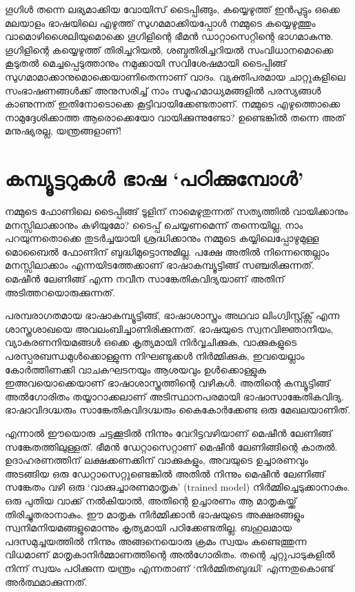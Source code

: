 \documentclass[12pt,twoside,a4paper]{article}
\begin{document}
ഗൂഗിൾ തന്നെ ലഭ്യമാക്കിയ വോയിസ് ടൈപ്പിങ്ങും, കയ്യെഴുത്ത് ഇൻപുട്ടും ഒക്കെ മലയാളം ഭാഷയിലെ എഴുത്ത് സുഗമമാക്കിയപ്പോൾ നമ്മുടെ കയ്യെഴുത്തും വാമൊഴിശൈലിയുമൊക്കെ ഗൂഗിളിന്റെ ഭീമൻ ഡാറ്റാസെറ്റിന്റെ ഭാഗമാകുന്നു. ഗൂഗിളിന്റെ കയ്യെഴുത്ത് തിരിച്ചറിയൽ, ശബ്ദതിരിച്ചറിയൽ സംവിധാനമൊക്കെ കൂടുതൽ മെച്ചപ്പെടുത്താനും നമുക്കായി സവിശേഷമായി ടൈപ്പിങ്ങ് സുഗമാമാക്കാനുമൊക്കെയാണിതെന്നാണ് വാദം. വ്യക്തിപരമായ ചാറ്റുകളിലെ സംഭാഷണങ്ങൾക്ക് അനുസരിച്ച് നാം സമൂഹമാധ്യമങ്ങളിൽ പരസ്യങ്ങൾ  കാണുന്നത് ഇതിനോടൊക്കെ കൂട്ടിവായിക്കേണ്ടതാണ്. നമ്മുടെ എഴുത്തൊക്കെ നാമുദ്ദേശിക്കാത്ത ആരൊക്കെയോ വായിക്കുന്നുണ്ടോ? ഉണ്ടെങ്കിൽ തന്നെ അത് മനുഷ്യരല്ല, യന്ത്രങ്ങളാണ്!

\section{കമ്പ്യൂട്ടറുകൾ ഭാഷ `പഠിക്കുമ്പോൾ'}

നമ്മുടെ ഫോണിലെ ടൈപ്പിങ്ങ് ടൂളിന് നാമെഴുതുന്നത്  സത്യത്തിൽ വായിക്കാനും മനസ്സിലാക്കാനും കഴിയുമോ?  ടൈപ്പ് ചെയ്യണമെന്ന് തന്നെയില്ല, നാം പറയുന്നതൊക്കെ തുടർച്ചയായി ശ്രദ്ധിക്കാനും നമ്മുടെ കയ്യിലെപ്പോഴുമുള്ള മൊബൈൽ ഫോണിന് ബുദ്ധിമുട്ടൊന്നുമില്ല. പക്ഷേ അതിൽ നിന്നെന്തെല്ലാം മനസ്സിലാക്കാം എന്നയിടത്തേക്കാണ് ഭാഷാകമ്പ്യൂട്ടിങ്ങ് സഞ്ചരിക്കുന്നത്. മെഷീൻ ലേണിങ്ങ് എന്ന നവീന സാങ്കേതികവിദ്യയാണ് അതിന് അടിത്തറയൊരുക്കുന്നത്.

പരമ്പരാഗതമായ ഭാഷാകമ്പ്യൂട്ടിങ്ങ്, ഭാഷാശാസ്ത്രം അഥവാ ലിംഗ്വിസ്റ്റ്ക്സ് എന്ന ശാസ്ത്രശാഖയെ അവലംബിച്ചാണിരിക്കുന്നത്. ഭാഷയുടെ സ്വനവിജ്ഞാനീയം, വ്യാകരണനിയമങ്ങൾ ഒക്കെ കൃത്യമായി നിർവ്വചിക്കുക, വാക്കുകളുടെ പരസ്പരബന്ധമുൾക്കൊള്ളുന്ന നിഘണ്ടുക്കൾ നിർമ്മിക്കുക, ഇവയെല്ലാം കോർത്തിണക്കി വാചകഘടനയും ആശയവും ഉൾക്കൊള്ളുക ഇഅവയൊക്കെയാണ് ഭാഷാശാസ്ത്രത്തിന്റെ വഴികൾ. അതിന്റെ കമ്പ്യൂട്ടിങ്ങ് അൽഗോരിതം തയ്യാറാക്കലാണ് അടിസ്ഥാനപരമായി ഭാഷാസാങ്കേതികവിദ്യ. ഭാഷാവിദഗ്ദ്ധരും സാങ്കേതികവിദഗ്ദ്ധരും കൈകോർക്കേണ്ട ഒരു മേഖലയാണിത്.

എന്നാൽ ഈയൊരു ചട്ടക്കൂടിൽ നിന്നും വേറിട്ടവഴിയാണ് മെഷീൻ ലേണിങ്ങ് സങ്കേതത്തിലുള്ളത്. ഭീമൻ ഡേറ്റാസെറ്റാണ് മെഷീൻ ലേണിങ്ങിന്റെ കാതൽ. ഉദാഹരണത്തിന് ലക്ഷക്കണക്കിന് വാക്കുകളും, അവയുടെ ഉച്ചാരണവും അടങ്ങിയ ഒരു ഡേറ്റാസെറ്റുണ്ടെങ്കിൽ അതിൽ നിന്നും മെഷീൻ ലേണിങ്ങ് സങ്കേതം വഴി ഒരു `വാക്കുച്ചാരണമാതൃക' (trained model) നിർമ്മിച്ചെടുക്കാനാകും. ഒരു പുതിയ വാക്ക് നൽകിയാൽ, അതിന്റെ ഉച്ചാരണം ആ മാതൃകയ്ക്ക് തിരിച്ചുതരാനാകും. ഈ മാതൃക നിർമ്മിക്കാൻ ഭാഷയുടെ അക്ഷരങ്ങളും സ്വനിമനിയമങ്ങളുമൊന്നും കൃത്യമായി പഠിക്കേണ്ടതില്ല. ബഹുലമായ പദസമുച്ചയത്തിൽ നിന്നും അങ്ങനെയൊരു ക്രമം സ്വയം കണ്ടെത്തുന്ന വിധമാണ് മാതൃകാനിർമ്മാണത്തിന്റെ അൽഗോരിതം. തന്റെ ചുറ്റുപാടുകളിൽ നിന്ന് സ്വയം പഠിക്കുന്ന യന്ത്രം എന്നതാണ് `നിർമ്മിതബുദ്ധി' എന്നതുകൊണ്ട് അർത്ഥമാക്കുന്നത്.
\end{document}
